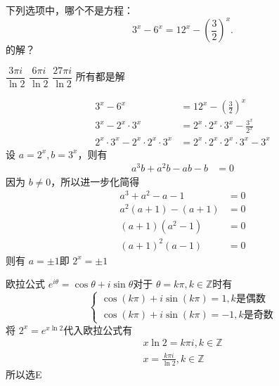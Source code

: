 \documentclass[answers]{exam}
\begin{document}
\begin{questions}
	\question 下列选项中，哪个不是方程：
	\begin{equation*}
		3^x - 6^x = 12^x - \left(\frac32\right)^x.
	\end{equation*}
	的解？

	\begin{oneparchoices}
		\choice \( \dfrac{3\pi i}{\ln2} \)
		\choice \( \dfrac{6\pi i}{\ln2} \)
		\choice \( \dfrac{27\pi i}{\ln2} \)
		\CorrectChoice 所有都是解
	\end{oneparchoices}

	\begin{solution}
		\begin{align*}
			3^x - 6^x                               & = 12^x - \left(\frac32\right)^x             \\
			3^x - 2^x \cdot 3^x                     & = 2^x \cdot 2^x \cdot 3^x - \frac{3^x}{2^x} \\
			2^x \cdot 3^x - 2^x \cdot 2^x \cdot 3^x & = 2^x \cdot 2^x \cdot 2^x \cdot 3^x - 3^x
		\end{align*}
		设 \( a = 2^x, b = 3^x \)，则有
		\begin{align*}
			a^3b + a^2b - ab - b & = 0
		\end{align*}
		因为 \( b \ne 0 \)，所以进一步化简得
		\begin{align*}
			a^3 + a^2 - a - 1 & = 0 \\
			a^2(a+1) - (a+1)  & = 0 \\
			(a+1)(a^2 - 1)    & = 0 \\
			(a+1)^2(a-1)      & = 0
		\end{align*}
		则有 \( a = \pm 1 \)即 \( 2^x = \pm 1 \)

		欧拉公式 \( e^{i\theta} = \cos\theta + i\sin\theta \)对于 \( \theta = k\pi, k \in \mathbb{Z}  \)时有
		\begin{equation*}
			\begin{cases}
				\cos(k\pi) + i\sin(k\pi) = 1, k \text{是偶数} \\
				\cos(k\pi) + i\sin(k\pi) = -1, k \text{是奇数}
			\end{cases}
		\end{equation*}
		将 \( 2^x = e^{x\ln2} \)代入欧拉公式有
		\begin{gather*}
			x \ln 2 = k\pi i,  k \in \mathbb{Z} \\
			x = \frac{k\pi i}{\ln2}, k \in \mathbb{Z}
		\end{gather*}
		所以选E
	\end{solution}


\end{questions}
\end{document}
